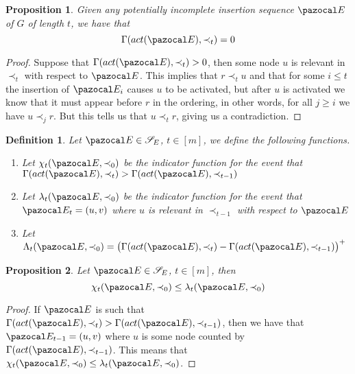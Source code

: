 \documentclass{article}
\newtheorem{proposition}{Proposition}
\newtheorem{definition}{Definition}
\begin{document}
\begin{proposition}
Given any potentially incomplete insertion sequence $\pazocal E$ of $G$ of length $t$, we have that
\[ \Gamma(act(\pazocal E),\prec_t) = 0 \]
\end{proposition}

\begin{proof}
Suppose that $\Gamma(act(\pazocal E),\prec_t) > 0$, then some node $u$ is relevant in $\prec_t$ with respect to $\pazocal E$. This implies that $r \prec_t u$ and that for some $i \leq t$ the insertion of $\pazocal E_i$ causes $u$ to be activated, but after $u$ is activated we know that it must appear before $r$ in the ordering, in other words, for all $j \geq i$ we have $u \prec_j r$. But this tells us that $u \prec_t r$, giving us a contradiction.
\end{proof}

\begin{definition}
Let $\pazocal E \in \mathcal S_E$, $t \in [m]$, we define the following functions.

\begin{enumerate}
    \item Let $\chi_t(\pazocal E, \prec_0)$ be the indicator function for the event that $\Gamma(act(\pazocal E), \prec_{t}) > \Gamma(act(\pazocal E), \prec_{t-1})$
    \item Let $\lambda_t(\pazocal E, \prec_0)$ be the indicator function for the event that $\pazocal E_{t}=(u,v)$ where $u$ is relevant in $\prec_{t-1}$ with respect to $\pazocal E$
    \item Let $\Lambda_t(\pazocal E, \prec_0) = \big(\Gamma(act(\pazocal E), \prec_{t}) - \Gamma(act(\pazocal E), \prec_{t-1})\big)^+$
\end{enumerate}

\end{definition}

\begin{proposition}
Let $\pazocal E \in \mathcal S_E$, $t \in [m]$, then \[\chi_t(\pazocal E, \prec_0) \leq \lambda_t(\pazocal E, \prec_0)\]
\end{proposition}

\begin{proof}
If $\pazocal E$ is such that $\Gamma(act(\pazocal E), \prec_{t}) > \Gamma(act(\pazocal E), \prec_{t-1})$, then we have that $\pazocal E_{t-1}=(u,v)$ where $u$ is some node counted by $\Gamma(act(\pazocal E), \prec_{t-1})$. This means that $\chi_t(\pazocal E, \prec_0) \leq \lambda_t(\pazocal E, \prec_0)$.
\end{proof}
\end{document}
